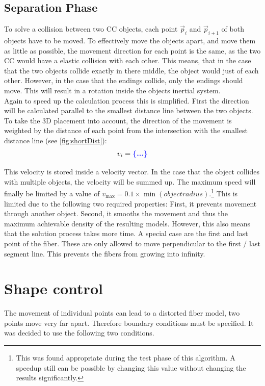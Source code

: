 \subsection{Separation Phase}
To solve a collision between two \ac{CC} objects, each point $\vec{p}_i$ and $\vec{p}_{i+1}$ of both objects have to be moved.
To effectively move the objects apart, and move them as little as possible, the movement direction for each point is the same, as the two \ac{CC} would have a elastic collision with each other.
This means, that in the case that the two objects collide exactly in there middle, the object would just  of each other.
However, in the case that the endings collide, only the endings should move.
This will result in a rotation inside the objects inertial system.
\\
Again to speed up the calculation process this is simplified.
First the direction will be calculated parallel to the smallest distance line between the two objects.
To take the 3D placement into account, the direction of the movement is weighted by the distance of each point from the intersection with the smallest distance line (see \cref{fig:shortDist}):
\begin{align}
v_i = \dummy{}
\end{align}
\par
%
This velocity is stored inside a velocity vector.
In the case that the object collides with multiple objects, the velocity will be summed up.
The maximum speed will finally be limited by a value of $v_{\max} = 0.1 \times \min(\mathit{object radius})$.\footnote{This was found appropriate during the test phase of this algorithm. A speedup still can be possible by changing this value without changing the results significantly.}
This is limited due to the following two required properties:
First, it prevents movement through another object.
Second, it smooths the movement and thus the maximum achievable density of the resulting models.
However, this also means that the solution process takes more time.
A special case are the first and last point of the fiber.
These are only allowed to move perpendicular to the first / last segment line.
This prevents the fibers from growing into infinity.
%
\section{Shape control}\label{chap5:ShapeControl}
The movement of individual points can lead to a distorted fiber model, \eg{} two points move very far apart.
Therefore boundary conditions must be specified.
It was decided to use the following two conditions.
%
